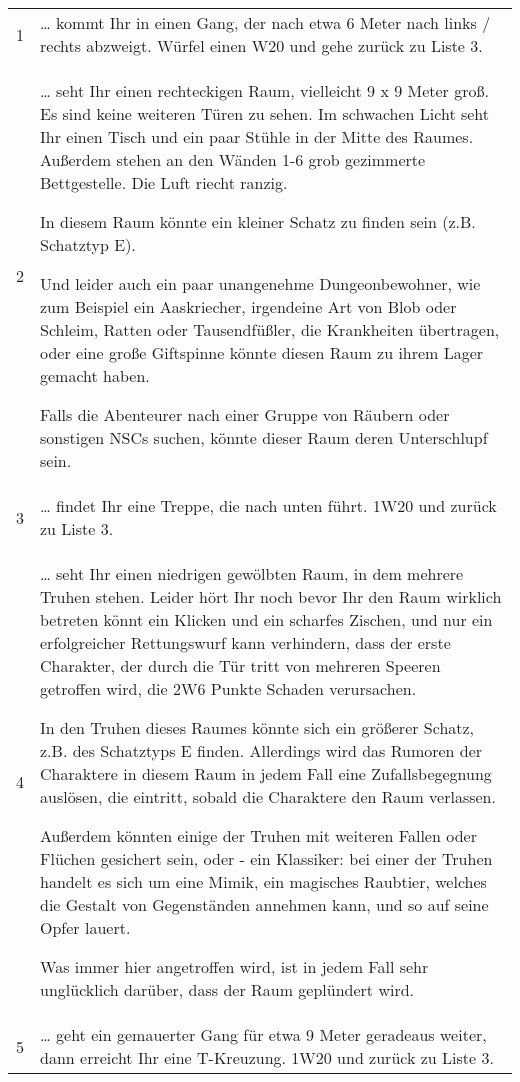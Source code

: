 \begin{tabularx}{\columnwidth}{cZ}
1 & 
  \ldots{} kommt Ihr in einen Gang, der nach etwa 6 Meter nach links /
  rechts abzweigt. Würfel einen W20 und gehe zurück zu Liste 3.
\\
2 & 
  \ldots{} seht Ihr einen rechteckigen Raum, vielleicht 9 x 9 Meter
  groß. Es sind keine weiteren Türen zu sehen. Im schwachen Licht seht
  Ihr einen Tisch und ein paar Stühle in der Mitte des Raumes. Außerdem
  stehen an den Wänden 1-6 grob gezimmerte Bettgestelle. Die Luft riecht
  ranzig.

  In diesem Raum könnte ein kleiner Schatz zu finden sein (z.B.
  Schatztyp E).

  Und leider auch ein paar unangenehme Dungeonbewohner, wie zum Beispiel
  ein Aaskriecher, irgendeine Art von Blob oder Schleim, Ratten oder
  Tausendfüßler, die Krankheiten übertragen, oder eine große Giftspinne
  könnte diesen Raum zu ihrem Lager gemacht haben.

  Falls die Abenteurer nach einer Gruppe von Räubern oder sonstigen NSCs
  suchen, könnte dieser Raum deren Unterschlupf sein.
\\
3 & 
  \ldots{} findet Ihr eine Treppe, die nach unten führt. 1W20 und zurück
  zu Liste 3.
\\
4 & 
  \ldots{} seht Ihr einen niedrigen gewölbten Raum, in dem mehrere
  Truhen stehen. Leider hört Ihr noch bevor Ihr den Raum wirklich
  betreten könnt ein Klicken und ein scharfes Zischen, und nur ein
  erfolgreicher Rettungswurf kann verhindern, dass der erste Charakter,
  der durch die Tür tritt von mehreren Speeren getroffen wird, die 2W6
  Punkte Schaden verursachen.

  In den Truhen dieses Raumes könnte sich ein größerer Schatz, z.B. des
  Schatztyps E finden. Allerdings wird das Rumoren der Charaktere in
  diesem Raum in jedem Fall eine Zufallsbegegnung auslösen, die
  eintritt, sobald die Charaktere den Raum verlassen.

  Außerdem könnten einige der Truhen mit weiteren Fallen oder Flüchen
  gesichert sein, oder - ein Klassiker: bei einer der Truhen handelt es
  sich um eine Mimik, ein magisches Raubtier, welches die Gestalt von
  Gegenständen annehmen kann, und so auf seine Opfer lauert.

  Was immer hier angetroffen wird, ist in jedem Fall sehr unglücklich
  darüber, dass der Raum geplündert wird.
\\
5 & 
  \ldots{} geht ein gemauerter Gang für etwa 9 Meter geradeaus weiter,
  dann erreicht Ihr eine T-Kreuzung. 1W20 und zurück zu Liste 3.
\\
\end{tabularx}
